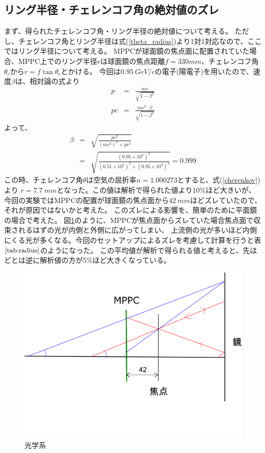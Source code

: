 \documentclass[uplatex, titlepage, dvipdfmx, 12pt, a4paper]{jsreport}
\begin{document}
    \subsection{リング半径・チェレンコフ角の絶対値のズレ}
    まず、得られたチェレンコフ角・リング半径の絶対値について考える。
    ただし、チェレンコフ角とリング半径は式(\ref{theta_radius})より1対1対応なので、ここではリング半径について考える。
    MPPCが球面鏡の焦点面に配置されていた場合、MPPC上でのリング半径$r$は球面鏡の焦点距離$f=330 mm$、チェレンコフ角$\theta_{c}$から$r=f\tan{\theta_{c}}$とかける。
    今回は$\SI{0.95}{GeV/c}$の電子(陽電子)を用いたので、速度$\beta$は、相対論の式より
    \begin{eqnarray}
      p &=& \frac{mv}{\sqrt{1-{\beta}^2}} \nonumber \\
      pc &=& \frac{mc^2\cdot \beta}{\sqrt{1-{\beta}^2}} \nonumber 
    \end{eqnarray}
    よって、
    \begin{eqnarray}
      \beta &=& \sqrt{\frac{{pc}^2}{\left(mc^2\right)^2 + {pc}^2}} \nonumber \\
      &=& \sqrt{\frac{\left(0.95\times 10^9\right)^2}{\left(0.51\times 10^6\right)^2 + \left(0.95\times 10^9\right)^2}} = 0.999 \nonumber
    \end{eqnarray}
    この時、チェレンコフ角$\theta$は空気の屈折率$n=1.000273$とすると、式(\ref{cherenkov})より
    $r=\SI{7.7}{mm}$となった。この値は解析で得られた値より10\%ほど大きいが、
    今回の実験ではMPPCの配置が球面鏡の焦点面から$\SI{42}{mm}$ほどズレていたので、それが原因ではないかと考えた。
    このズレによる影響を、簡単のために平面鏡の場合で考えた。
    図\ref{fig:optical_system}のように、MPPCが焦点面からズレていた場合焦点面で収束されるはずの光が内側と外側に広がってしまい、
    上流側の光が多いほど内側にくる光が多くなる。今回のセットアップによるズレを考慮して計算を行うと表$\ref{tab:radius}$のようになった。
    この平均値が解析で得られる値と考えると、先ほどとは逆に解析値の方が5\%ほど大きくなっている。
    \begin{figure}[hbtp]
      \begin{center} 
        \includegraphics[scale=1, clip]{image/optical_system.png}
        \caption{光学系} 
        \label{fig:optical_system} 
      \end{center}
    \end{figure}
\end{document}
